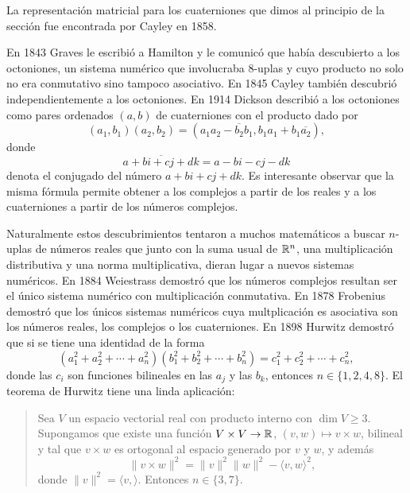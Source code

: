 La representación matricial para los cuaterniones que dimos al principio de la
sección fue encontrada por Cayley en 1858. 

En 1843 Graves le escribió a Hamilton y le comunicó que había descubierto a los
octoniones, un sistema numérico que involucraba $8$-uplas y cuyo producto no
solo no era conmutativo sino tampoco asociativo. En 1845 Cayley también
descubrió independientemente a los octoniones. En 1914 Dickson describió a los
octoniones como pares ordenados $(a,b)$ de cuaterniones con el producto dado por
\[
	(a_1,b_1)(a_2,b_2)=(a_1a_2-\overline{b_2}b_1,b_1a_1+b_1\overline{a_2}),
\]
donde 
\[
	\overline{a+bi+cj+dk}=a-bi-cj-dk
\]
denota el conjugado del número
$a+bi+cj+dk$. Es interesante observar que la misma fórmula permite obtener a
los complejos a partir de los reales y a los cuaterniones a partir de los
números complejos. 

Naturalmente estos descubrimientos tentaron a muchos matemáticos a buscar
$n$-uplas de números reales que junto con la suma usual de $\mathbb{R}^n$, una
multiplicación distributiva y una norma multiplicativa, dieran lugar a nuevos
sistemas numéricos. En 1884 Weiestrass demostró que los números complejos
resultan ser el único sistema numérico con multiplicación conmutativa.  En 1878
Frobenius demostró que los únicos sistemas numéricos cuya multplicación es
asociativa son los números reales, los complejos o los cuaterniones.  En 1898
Hurwitz demostró que si se tiene una identidad de la forma
\[
	(a_1^2+a_2^2+\cdots+a_n^2)(b_1^2+b_2^2+\cdots+b_n^2)
	=c_1^2+c_2^2+\cdots+c_n^2,
\]
donde las $c_i$ son funciones bilineales en las $a_j$ y las $b_k$, entonces
$n\in\{1,2,4,8\}$. 
El teorema de Hurwitz tiene una linda aplicación: 

\begin{quote}
Sea $V$ un espacio vectorial real con producto interno con $\dim V\geq3$.
Supongamos que existe una función $V\times V\to\mathbb{R}$, $(v,w)\mapsto v\times w$,
bilineal y tal que $v\times w$ es ortogonal al espacio generado por $v$ y $w$,
y además 
\[
	\|v\times w\|^2=\|v\|^2\|w\|^2-\langle v,w\rangle^2,
\]
donde $\|v\|^2=\langle v,\rangle$. Entonces $n\in\{3,7\}$. 
\end{quote}

